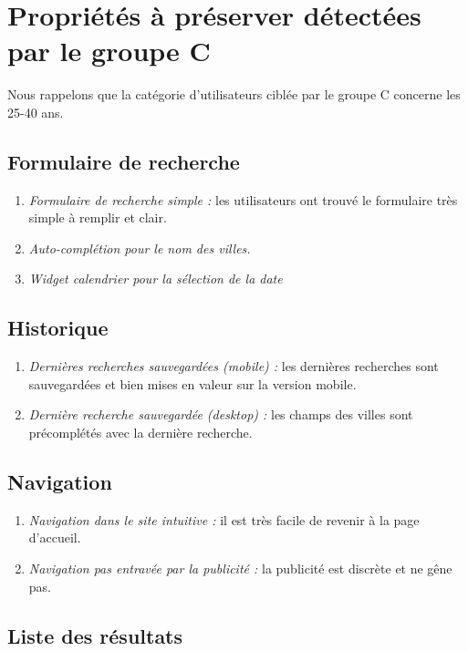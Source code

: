 \section{Propri\'{e}t\'{e}s \`{a} pr\'{e}server d\'{e}tect\'{e}es par le groupe C}

Nous rappelons que la cat\'{e}gorie d'utilisateurs cibl\'{e}e par le groupe C concerne les 25-40 ans.


\subsection{Formulaire de recherche}
\begin{enumerate}
\item {\em Formulaire de recherche simple : } les utilisateurs ont trouv\'{e} le formulaire tr\`{e}s simple \`{a} remplir et clair.
\item {\em Auto-compl\'{e}tion pour le nom des villes.}
\item {\em Widget calendrier pour la s\'{e}lection de la date}
\end{enumerate}

\subsection{Historique}
\begin{enumerate}
\item {\em Derni\`{e}res recherches sauvegard\'{e}es (mobile) : } les derni\`{e}res recherches sont sauvegard\'{e}es et bien mises en valeur sur la version mobile.
\item {\em Derni\`{e}re recherche sauvegard\'{e}e (desktop) : }	les champs des villes sont pr\'{e}compl\'{e}t\'{e}s avec la derni\`{e}re recherche.
\end{enumerate}

\subsection{Navigation}
\begin{enumerate}
\item {\em Navigation dans le site intuitive : } il est tr\`{e}s facile de revenir \`{a} la page d'accueil.
\item {\em Navigation pas entrav\'{e}e par la publicit\'{e} : } la publicit\'{e} est discr\`{e}te et ne g\^{e}ne pas.
\end{enumerate}


\subsection{Liste des r\'{e}sultats}

